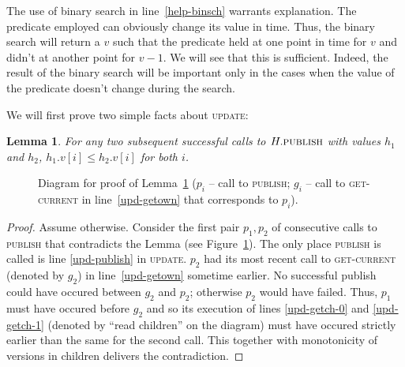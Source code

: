 \documentclass[a4paper,11pt]{article}
\newcommand{\atomic}[4]{\node(lab#1) at (#3,-#4+0.5) {#2};\draw (#3,-#4-0.1) to (lab#1);\node[inner sep=0pt](#1) at (#3,-#4) {};}
\newtheorem{lemma}{Lemma}
\newcommand{\fn}[1]{\textsc{#1}}
\begin{document}
The use of binary search in line~\ref{help-binsch} warrants explanation. The predicate employed can obviously change its value in time. Thus, the binary search will return a $v$ such that the predicate held at one point in time
for $v$ and didn't at another point for $v-1$. We will see that this is sufficient. Indeed, the result of the binary search will be important only in the cases when the value of the predicate doesn't change during
the search.

We will first prove two simple facts about \fn{update}:

\begin{lemma}
\label{lem-versions-increase}
For any two subsequent successful calls to $H.\fn{publish}$ with values $h_1$ and $h_2$, $h_1.v[i] \leq h_2.v[i]$ for both $i$.
\end{lemma}
\begin{figure}[!h]
\caption{Diagram for proof of Lemma~\ref{lem-versions-increase} ($p_i$ -- call to \fn{publish}; $g_i$ -- call to \fn{get-current} in line~\ref{upd-getown} that corresponds to $p_i$).}
\label{fig-versions-increase}
\end{figure}
\begin{proof}
Assume otherwise. Consider the first pair $p_1, p_2$ of consecutive calls to \fn{publish} that contradicts the Lemma (see Figure~\ref{fig-versions-increase}). The only place \fn{publish} is called is line \ref{upd-publish}
in \fn{update}.
$p_2$ had its most recent call to \fn{get-current} (denoted by $g_2$) in line~\ref{upd-getown} sometime earlier. No successful publish could have occured between $g_2$ and $p_2$; otherwise $p_2$
would have failed.
Thus, $p_1$ must have occured before $g_2$ and so its execution of lines \ref{upd-getch-0} and \ref{upd-getch-1} (denoted by ``read children'' on the diagram) must have occured strictly earlier than
the same for the second call. This together with monotonicity of versions in children delivers the contradiction.
\end{proof}
\end{document}
